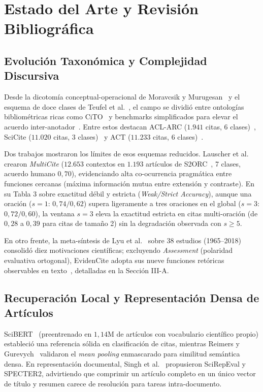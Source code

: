 \documentclass[conference]{IEEEtran}
\begin{document}
\section{Estado del Arte y Revisión Bibliográfica}

\subsection{Evolución Taxonómica y Complejidad Discursiva}

Desde la dicotomía conceptual-operacional de Moravcsik y Murugesan~\cite{moravcsik1975some} y el esquema de doce clases de Teufel et al.~\cite{teufel2006automatic}, el campo se dividió entre ontologías bibliométricas ricas como CiTO~\cite{peroni2012fabio} y benchmarks simplificados para elevar el acuerdo inter-anotador~\cite{zhang2025deep}. Entre estos destacan ACL-ARC ($1.941$ citas, 6 clases)~\cite{jurgens2018measuring}, SciCite ($11.020$ citas, 3 clases)~\cite{cohan2019structural} y ACT ($11.233$ citas, 6 clases)~\cite{pride2020authoritative}.

Dos trabajos mostraron los límites de esos esquemas reducidos. Lauscher et al.~\cite{lauscher2022multicite} crearon \textit{MultiCite} ($12.653$ contextos en $1.193$ artículos de S2ORC~\cite{lo2020s2orc}, 7 clases, acuerdo humano $0,70$), evidenciando alta co-ocurrencia pragmática entre funciones cercanas (máxima información mutua entre extensión y contraste). En su Tabla 3 sobre exactitud débil y estricta (\textit{Weak/Strict Accuracy}), aunque una oración ($s=1$: $0,74/0,62$) supera ligeramente a tres oraciones en el global ($s=3$: $0,72/0,60$), la ventana $s=3$ eleva la exactitud estricta en citas multi-oración (de $0,28$ a $0,39$ para citas de tamaño 2) sin la degradación observada con $s \ge 5$.

En otro frente, la meta-síntesis de Lyu et al.~\cite{lyu2021classification} sobre 38 estudios (1965--2018) consolidó diez motivaciones científicas; excluyendo \textit{Assessment} (polaridad evaluativa ortogonal), EvidenCite adopta sus nueve funciones retóricas observables en texto~\cite{lyu2021classification,zhang2025deep}, detalladas en la Sección III-A.

\subsection{Recuperación Local y Representación Densa de Artículos}

SciBERT~\cite{beltagy2019scibert} (preentrenado en $1,14\text{M}$ de artículos con vocabulario científico propio) estableció una referencia sólida en clasificación de citas, mientras Reimers y Gurevych~\cite{reimers2019sentence} validaron el \textit{mean pooling} enmascarado para similitud semántica densa. En representación documental, Singh et al.~\cite{singh2023scirepeval} propusieron SciRepEval y SPECTER2, advirtiendo que comprimir un artículo completo en un único vector de título y resumen carece de resolución para tareas intra-documento.
\end{document}
